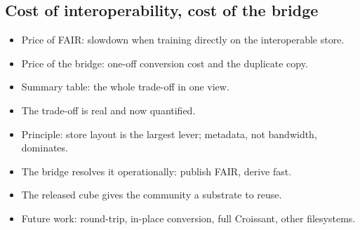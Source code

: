 \documentclass[gmd, manuscript]{copernicus}
\begin{document}
\subsection{Cost of interoperability, cost of the bridge}
\begin{itemize}
\item Price of FAIR: slowdown when training directly on the interoperable store.
\item Price of the bridge: one-off conversion cost and the duplicate copy.
\item Summary table: the whole trade-off in one view.
\end{itemize}
\conclusions  %
\begin{itemize}
\item The trade-off is real and now quantified.
\item Principle: store layout is the largest lever; metadata, not bandwidth, dominates.
\item The bridge resolves it operationally: publish FAIR, derive fast.
\item The released cube gives the community a substrate to reuse.
\item Future work: round-trip, in-place conversion, full Croissant, other filesystems.
\end{itemize}
\appendix
\end{document}
